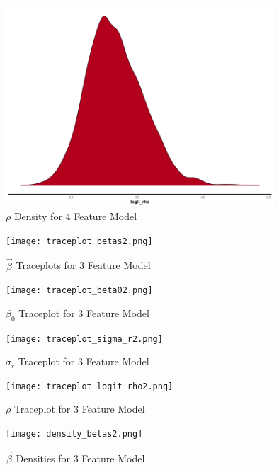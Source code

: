 \documentclass[11pt]{article}
\begin{document}
\begin{figure}[h!] 
	\centering
  \includegraphics[height=75mm]{density_logit_rho.png}
  \caption{$\rho$ Density for 4 Feature Model}
  \label{fig:dlogit_rho}
\end{figure}












\begin{figure}[h!] 
	\centering
  \texttt{[image: traceplot\_betas2.png]}
  \caption{$\vec{\beta}$ Traceplots for 3 Feature Model}
  \label{fig:tbetas2}
\end{figure}

\begin{figure}[h!] 
	\centering
  \texttt{[image: traceplot\_beta02.png]}
  \caption{$\beta_0$ Traceplot for 3 Feature Model}
  \label{fig:tbeta02}
\end{figure}

\begin{figure}[h!] 
	\centering
  \texttt{[image: traceplot\_sigma\_r2.png]}
  \caption{$\sigma_r$ Traceplot for 3 Feature Model}
  \label{fig:tsigma_r2}
\end{figure}

\begin{figure}[h!] 
	\centering
  \texttt{[image: traceplot\_logit\_rho2.png]}
  \caption{$\rho$ Traceplot for 3 Feature Model}
  \label{fig:tlogit_rho2}
\end{figure}



\begin{figure}[h!] 
	\centering
  \texttt{[image: density\_betas2.png]}
  \caption{$\vec{\beta}$ Densities for 3 Feature Model}
  \label{fig:dbetas2}
\end{figure}
\end{document}
